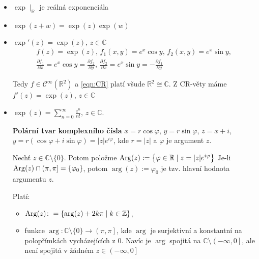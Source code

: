 \begin{properties}
\mbox{}
\vspace{-2em}
\begin{itemize}    
    \item $\exp \mid_\mathbb{R}$ je reálná exponenciála 
    \item $\exp(z+w)=\exp(z)\exp(w)$
    \item $\exp'(z)=\exp(z)$, $ z \in\mathbb{C}$
     \begin{multline*}
         f(z)=\exp(z)\text{, }f_1(x,y)=e^x \cos y\text{, } f_2(x,y)=e^x\sin y\text{, }\\
         \frac{\partial f_1}{\partial x} = e^x\cos y = \frac{\partial f_2}{\partial y}\text{, }
     \frac{\partial f_2}{\partial x} = e^x \sin y= - \frac{\partial f_1}{\partial y}
     \end{multline*}
     
    Tedy $f\in\mathcal{C}^{\infty}(\mathbb{R}^2)$ a \cref{eqn:CR} platí všude $\mathbb{R}^2\cong\mathbb{C}$. Z CR-věty máme $f'(z)=\exp(z)$, $z\in\mathbb{C}$
    \item $\exp(z)=\sum_{n=0}^{\infty}\frac{z^n}{n!}$, $z\in\mathbb{C}\text{.}$
    \newline
     
    \textbf{Polární tvar komplexního čísla}
       $ x=r\cos \varphi$, $
        y=r\sin \varphi$, $
        z=x+i$, $ y=r(\cos \varphi + i \sin \varphi)=\lvert z \rvert e^{i\varphi} $, kde $r=\lvert z \rvert$ a $\varphi$ je argument $z$.
    
     
    \begin{notation*}
          Nechť $z\in\mathbb{C}\setminus\{0\}$. Potom položme $\operatorname*{Arg}(z):=\left\{\varphi\in\mathbb{R}\mid z=\lvert z \rvert e^{i\varphi}\right\}$ Je-li $\operatorname*{Arg}(z) \cap  (\pi,\pi]=\{\varphi_0\}$, potom $\arg(z):=\varphi_0$ je tzv. hlavní hodnota argumentu $z$. 
    \end{notation*}
     
         Platí: 
        \begin{itemize}
            \item $\operatorname*{Arg}(z)\colon = \{\arg(z)+2k\pi\mid k\in\mathbb{Z}\}$,
            \item funkce $\arg\colon \mathbb {C}\setminus\{0\} \to \left (\pi,\pi\right ]$, kde $\arg$ je surjektivní a  konstantní na polopřímkách vycházejících z $0$. Navíc je $\arg$ spojitá na $\mathbb {C}\setminus\left (-\infty,0\right ]$, ale není spojitá v žádném $z\in \left (-\infty,0\right ]$
        \end{itemize}


\end{itemize}
\end{properties}

